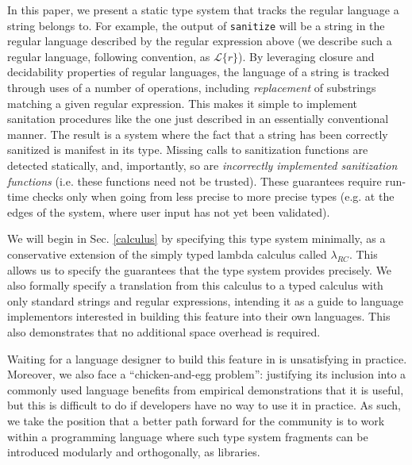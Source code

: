 \documentclass[9pt]{sig-alternate}
\theoremstyle{definition}
\begin{document}
In this paper, we present a static type system that tracks the regular language a string belongs to. For example, the output of \verb|sanitize| will be a string in the regular language described by the regular expression above (we describe such a regular language, following convention, as $\mathcal{L}\{r\}$). By leveraging closure and decidability properties of regular languages, the language of a string is tracked through uses of a number of operations, including \emph{replacement} of substrings matching a given regular expression. This makes it simple to implement sanitation procedures like the one just described in an essentially conventional manner. The result is a system where the fact that a string has been {correctly} sanitized is manifest in its type. Missing calls to sanitization functions are detected statically, and, importantly, so are \emph{incorrectly implemented sanitization functions} (i.e. these functions need not be trusted). These guarantees require run-time checks only when going from less precise to more precise types (e.g. at the edges of the system, where user input has not yet been validated). %

We will begin in Sec. \ref{calculus} by specifying this type system minimally, as a conservative extension of the simply typed lambda calculus called $\lambda_{RC}$. This allows us to specify the guarantees that the type system provides precisely. We also formally specify a translation from this calculus to a typed calculus with only standard strings and regular expressions, intending it as a guide to language implementors interested in building this feature into their own languages. This also demonstrates that no additional space overhead is required.

Waiting for a language designer to build this feature in is unsatisfying in practice. Moreover, we also face a ``chicken-and-egg problem'': justifying its inclusion into a commonly used language benefits from empirical demonstrations that it is useful, but this is difficult to do if developers have no way to use it in practice. As such, we take the position that a better path forward for the community is to work within a programming language where such type system fragments can be introduced modularly and orthogonally, as libraries. 
\end{document}
